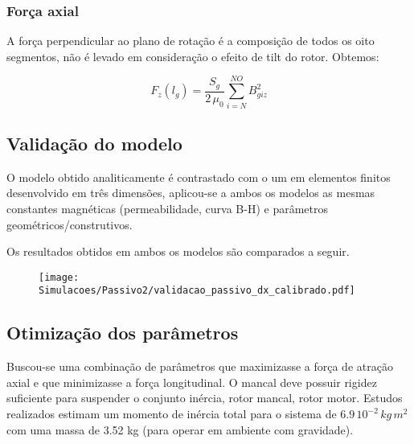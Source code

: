 \subsubsection{Força axial}

A força perpendicular ao plano de rotação é a composição de todos os oito segmentos, não é levado em consideração o efeito de tilt do rotor. Obtemos:

\begin{equation}
	  		F_z(l_g) = \frac{S_{g}}{2 \, \mu_0} 	\sum_{i=N}^{NO} B_{giz}^2
\end{equation}

\subsection{Validação do modelo}

O modelo obtido analiticamente é contrastado com o um em elementos finitos desenvolvido em três dimensões, aplicou-se a ambos os modelos as mesmas constantes magnéticas (permeabilidade, curva B-H) e parâmetros geométricos/construtivos.

Os resultados obtidos em ambos os modelos são comparados a seguir.


\begin{figure}[th!]
\centering
\texttt{[image: Simulacoes/Passivo2/validacao\_passivo\_dx\_calibrado.pdf]}
\caption{}
\label{fig:validacao_passivo_dx_calibrado}
\end{figure}




\subsection{Otimização dos parâmetros}

Buscou-se uma combinação de parâmetros que maximizasse a força de atração axial e que minimizasse a força longitudinal. O mancal deve possuir rigidez suficiente para suspender o conjunto inércia, rotor mancal, rotor motor. Estudos realizados estimam um momento de inércia total para o sistema de $6.9 \, 10^{-2} \, kg \, m^2$ com uma massa de 3.52 kg (para operar em ambiente com gravidade). 



